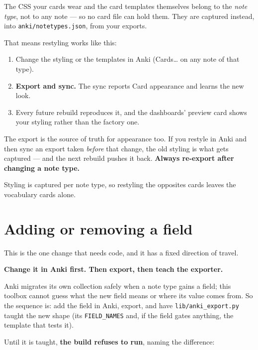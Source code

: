 \documentclass[11pt,oneside]{report}
\newcommand{\file}[1]{\texttt{#1}}
\newcommand{\menu}[1]{\textsf{#1}}
\begin{document}
The CSS your cards wear and the card templates themselves belong to the
\emph{note type}, not to any note --- so no card file can hold them. They are
captured instead, into \file{anki/notetypes.json}, from your exports.

That means restyling works like this:

\begin{enumerate}
\item Change the styling or the templates in Anki
  (\menu{Cards\ldots} on any note of that type).
\item \textbf{Export and sync.} The sync reports \textsf{Card appearance}
  and learns the new look.
\item Every future rebuild reproduces it, and the dashboards' \menu{preview
  card} shows your styling rather than the factory one.
\end{enumerate}

\begin{warnbox}
The export is the source of truth for appearance too. If you restyle in Anki
and then sync an export taken \emph{before} that change, the old styling is
what gets captured --- and the next rebuild pushes it back. \textbf{Always
re-export after changing a note type.}
\end{warnbox}

Styling is captured per note type, so restyling the opposites cards leaves
the vocabulary cards alone.

\section{Adding or removing a field}

This is the one change that needs code, and it has a fixed direction of
travel.

\begin{center}
\textbf{Change it in Anki first. Then export, then teach the exporter.}
\end{center}

Anki migrates its own collection safely when a note type gains a field; this
toolbox cannot guess what the new field means or where its value comes from.
So the sequence is: add the field in Anki, export, and have
\file{lib/anki\_export.py} taught the new shape (its \texttt{FIELD\_NAMES}
and, if the field gates anything, the template that tests it).

Until it is taught, \textbf{the build refuses to run}, naming the difference:
\end{document}
